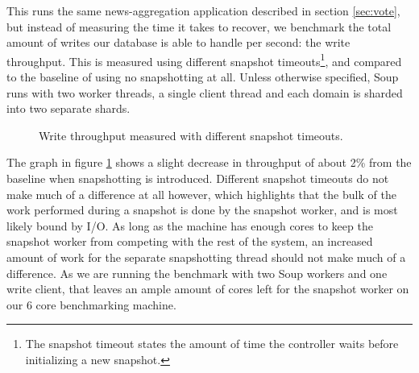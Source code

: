 \documentclass[b5paper]{report}
\begin{document}
This runs the same news-aggregation application described in section
\ref{sec:vote}, but instead of measuring the time it takes to recover, we
benchmark the total amount of writes our database is able to handle per second:
the write throughput. This is measured using different snapshot
timeouts\footnote{The snapshot timeout states the amount of time the controller
waits before initializing a new snapshot.}, and compared to the baseline of
using no snapshotting at all. Unless otherwise specified, Soup runs with two
worker threads, a single client thread and each domain is sharded into two
separate shards.

\begin{figure}
  \centering

  \caption{
    Write throughput measured with different snapshot timeouts.
    \label{fig:throughput}
  }
\end{figure}

The graph in figure \ref{fig:throughput} shows a slight decrease in throughput
of about 2\% from the baseline when snapshotting is introduced. Different
snapshot timeouts do not make much of a difference at all however, which
highlights that the bulk of the work performed during a snapshot is done by the
snapshot worker, and is most likely bound by I/O. As long as the machine has
enough cores to keep the snapshot worker from competing with the rest of the
system, an increased amount of work for the separate snapshotting thread should
not make much of a difference. As we are running the benchmark with two Soup
workers and one write client, that leaves an ample amount of cores left for the
snapshot worker on our 6 core benchmarking machine.
\end{document}
